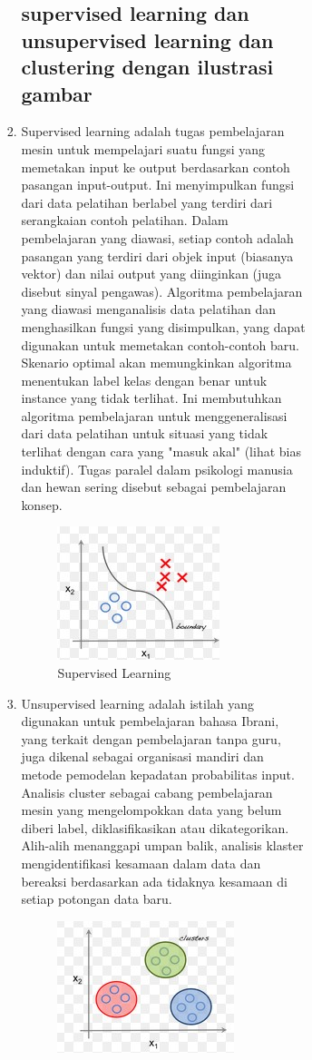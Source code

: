 \begin{enumerate}
\begin{enumerate}
\begin{enumerate}
\begin{enumerate}
\begin{enumerate}
\begin{enumerate}
\begin{enumerate}
\begin{enumerate}
\subsection{supervised learning dan unsupervised learning dan clustering
dengan ilustrasi gambar}
\item Supervised learning adalah tugas pembelajaran mesin untuk mempelajari suatu fungsi yang memetakan input ke output berdasarkan contoh pasangan input-output. Ini menyimpulkan fungsi dari data pelatihan berlabel yang terdiri dari serangkaian contoh pelatihan. Dalam pembelajaran yang diawasi, setiap contoh adalah pasangan yang terdiri dari objek input (biasanya vektor) dan nilai output yang diinginkan (juga disebut sinyal pengawas). Algoritma pembelajaran yang diawasi menganalisis data pelatihan dan menghasilkan fungsi yang disimpulkan, yang dapat digunakan untuk memetakan contoh-contoh baru. Skenario optimal akan memungkinkan algoritma menentukan label kelas dengan benar untuk instance yang tidak terlihat. Ini membutuhkan algoritma pembelajaran untuk menggeneralisasi dari data pelatihan untuk situasi yang tidak terlihat dengan cara yang "masuk akal" (lihat bias induktif). Tugas paralel dalam psikologi manusia dan hewan sering disebut sebagai pembelajaran konsep.
\begin{figure}[ht]
\centering
\includegraphics[scale=0.5]{figures/f2.jpg}
\caption{Supervised Learning}
\label{contoh}
\end{figure}
\item Unsupervised learning adalah istilah yang digunakan untuk pembelajaran bahasa Ibrani, yang terkait dengan pembelajaran tanpa guru, juga dikenal sebagai organisasi mandiri dan metode pemodelan kepadatan probabilitas input. Analisis cluster sebagai cabang pembelajaran mesin yang mengelompokkan data yang belum diberi label, diklasifikasikan atau dikategorikan. Alih-alih menanggapi umpan balik, analisis klaster mengidentifikasi kesamaan dalam data dan bereaksi berdasarkan ada tidaknya kesamaan di setiap potongan data baru.
\begin{figure}[ht]
\centering
\includegraphics[scale=0.5]{figures/f3.jpg}

\end{figure}
\end{enumerate}
\end{enumerate}
\end{enumerate}
\end{enumerate}
\end{enumerate}
\end{enumerate}
\end{enumerate}
\end{enumerate}
